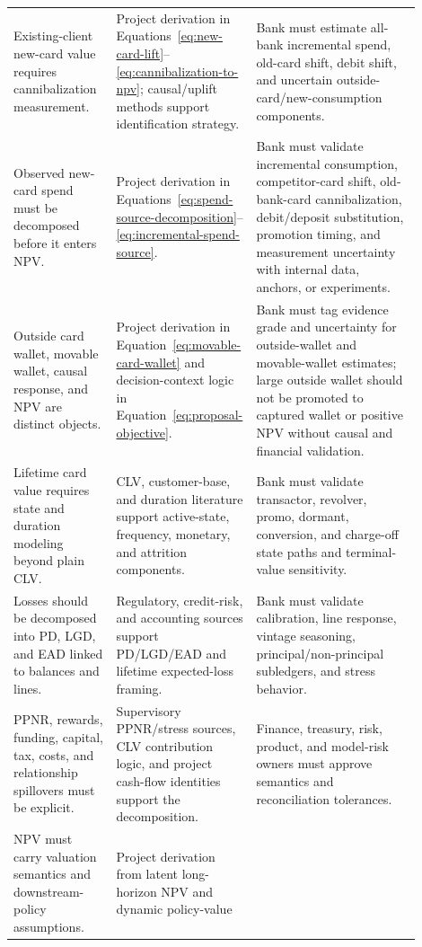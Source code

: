 \documentclass[11pt]{article}
\newcommand{\1}{\mathbf{1}}
\begin{document}
\begin{longtable}{p{0.25\linewidth}p{0.25\linewidth}p{0.40\linewidth}}
Existing-client new-card value requires cannibalization measurement.
  & Project derivation in
    Equations~\eqref{eq:new-card-lift}--\eqref{eq:cannibalization-to-npv};
    causal/uplift methods support identification strategy.
  & Bank must estimate all-bank incremental spend, old-card shift, debit shift,
    and uncertain outside-card/new-consumption components. \\
Observed new-card spend must be decomposed before it enters NPV.
  & Project derivation in
    Equations~\eqref{eq:spend-source-decomposition}--\eqref{eq:incremental-spend-source}.
  & Bank must validate incremental consumption, competitor-card shift,
    old-bank-card cannibalization, debit/deposit substitution, promotion timing,
    and measurement uncertainty with internal data, anchors, or experiments. \\
Outside card wallet, movable wallet, causal response, and NPV are distinct
objects.
  & Project derivation in Equation~\eqref{eq:movable-card-wallet} and
    decision-context logic in Equation~\eqref{eq:proposal-objective}.
  & Bank must tag evidence grade and uncertainty for outside-wallet and
    movable-wallet estimates; large outside wallet should not be promoted to
    captured wallet or positive NPV without causal and financial validation. \\
Lifetime card value requires state and duration modeling beyond plain CLV.
  & CLV, customer-base, and duration literature support active-state,
    frequency, monetary, and attrition components.
  & Bank must validate transactor, revolver, promo, dormant, conversion, and
    charge-off state paths and terminal-value sensitivity. \\
Losses should be decomposed into PD, LGD, and EAD linked to balances and lines.
  & Regulatory, credit-risk, and accounting sources support PD/LGD/EAD and
    lifetime expected-loss framing.
  & Bank must validate calibration, line response, vintage seasoning,
    principal/non-principal subledgers, and stress behavior. \\
PPNR, rewards, funding, capital, tax, costs, and relationship spillovers must
be explicit.
  & Supervisory PPNR/stress sources, CLV contribution logic, and project
    cash-flow identities support the decomposition.
  & Finance, treasury, risk, product, and model-risk owners must approve
    semantics and reconciliation tolerances. \\
NPV must carry valuation semantics and downstream-policy assumptions.
  & Project derivation from latent long-horizon NPV and dynamic policy-value

\end{longtable}
\end{document}
